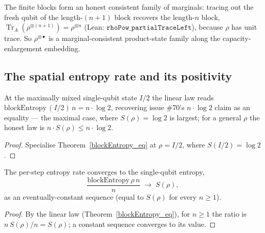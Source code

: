 The finite blocks form an honest consistent family of marginals: tracing out the fresh qubit of the
length-\((n+1)\) block recovers the length-\(n\) block,
\(\operatorname{Tr}_A(\rho^{\otimes(n+1)}) = \rho^{\otimes n}\) (Lean:
\(\texttt{rhoPow\_partialTraceLeft}\)), because \(\rho\) has unit trace. So \(\rho^{\otimes\bullet}\)
is a marginal-consistent product-state family along the capacity-enlargement embedding.

\subsection{The spatial entropy rate and its positivity}

\begin{theorem}\label{blockEntropy_maximallyMixed}
  \leanok
  At the maximally mixed single-qubit state \(I/2\) the linear law reads
  \(\mathrm{blockEntropy}\,(I/2)\,n = n\cdot\log 2\), recovering issue \#70's \(n\cdot\log 2\) claim as
  an equality --- the maximal case, where \(S(\rho) = \log 2\) is largest; for a general \(\rho\) the
  honest law is \(n\cdot S(\rho)\le n\cdot\log 2\).
\end{theorem}
\begin{proof}\leanok
  Specialise Theorem~\ref{blockEntropy_eq} at \(\rho = I/2\), where \(S(I/2) = \log 2\).
\end{proof}

\begin{theorem}\label{tendsto_blockEntropy_div}
  \leanok
  The per-step entropy rate converges to the single-qubit entropy,
  \[
    \frac{\mathrm{blockEntropy}\,\rho\,n}{n} \;\longrightarrow\; S(\rho),
  \]
  as an eventually-constant sequence (equal to \(S(\rho)\) for every \(n\ge 1\)).
\end{theorem}
\begin{proof}\leanok
  By the linear law (Theorem~\ref{blockEntropy_eq}), for \(n\ge 1\) the ratio is
  \(n\,S(\rho)/n = S(\rho)\); a constant sequence converges to its value.
\end{proof}

